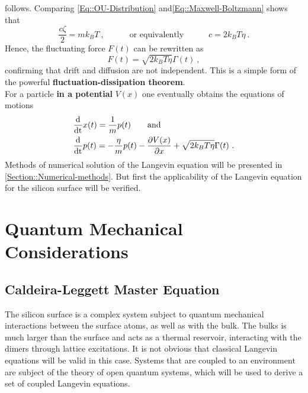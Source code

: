 	follows. Comparing \def\equationautorefname{Equations}\autoref{Eq::OU-Distribution} and\def\equationautorefname{}\autoref{Eq::Maxwell-Boltzmann} \def\equationautorefname{Equation}shows that
	\begin{equation}
		\frac{c \zeta}{2} =	m k_B T~, \qquad \quad \text{or equivalently} \qquad \quad c =	{2 k_B T \eta }~.
	\end{equation}
	Hence, the fluctuating force $F(t)$ can be rewritten as
	\begin{equation}
		F(t) =	\sqrt{2 k_B T \eta} \Gamma(t)~,
	\end{equation}
	confirming that drift and diffusion are not independent. This is a simple form of the powerful \textbf{fluctuation-dissipation theorem}. \\
	
	For a particle \textbf{in a potential} $V(x)$ one eventually obtains the equations of motions
	\begin{align} \label{Eq::Langevin-eq-motion-set-x}
		&\frac{\text{d}}{\text{\text{d}t}} x(t) =	\frac{1}{m} p(t) \qquad \text{and}\\
		\label{Eq::Langevin-eq-motion-set-p}
		&\frac{\text{d}}{\text{\text{d}t}} p(t) =	- \frac{\eta}{m} p(t) - \frac{\partial V(x)}{\partial x} + \sqrt{2 k_B T \eta } \Gamma(t) ~.
	\end{align}
	Methods of numerical solution of the Langevin equation will be presented in \autoref{Section::Numerical-methods}. But first the applicability of the Langevin equation for the silicon surface will be verified.
	\section{Quantum Mechanical Considerations}
	\subsection{Caldeira-Leggett Master Equation}
	The silicon surface is a complex system subject to quantum mechanical interactions between the surface atoms, as well as with the bulk. The bulks is much larger than the surface and acts as a thermal reservoir, interacting with the dimers through lattice excitations. It is not obvious that classical Langevin equations will be valid in this case. Systems that are coupled to an environment are subject of the theory of open quantum systems, which will be used to derive a set of coupled Langevin equations. \\
	
